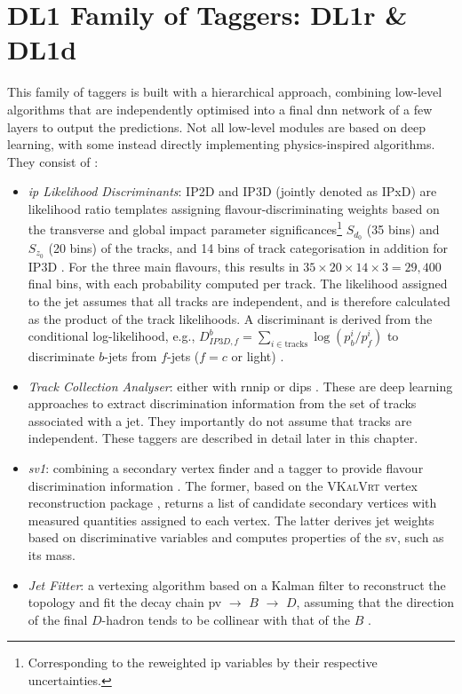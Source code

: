 \section{DL1 Family of Taggers: DL1r \& DL1d}
This family of taggers is built with a hierarchical approach, combining low-level algorithms that are independently optimised into a final \gls{dnn} network of a few layers to output the predictions. Not all low-level modules are based on deep learning, with some instead directly implementing physics-inspired algorithms. They consist of \cite{atlas:FTAGRUN2, Paganini:2289214}:
\begin{itemize}
  \item \textit{\gls{ip} Likelihood Discriminants}: IP2D and IP3D (jointly denoted as IPxD) are likelihood ratio templates assigning flavour-discriminating weights based on the transverse and global impact parameter significances\footnote{Corresponding to the reweighted \gls{ip} variables by their respective uncertainties.} $S_{d_0}$ (35 bins) and $S_{z_0}$ (20 bins) of the tracks, and 14 bins of track categorisation in addition for IP3D \cite{ATLAS:2017bcq}. For the three main flavours, this results in $35 \times 20 \times 14 \times 3 = 29,400$ final bins, with each probability computed per track. The likelihood assigned to the jet assumes that all tracks are independent, and is therefore calculated as the product of the track likelihoods. A discriminant is derived from the conditional log-likelihood, e.g., $D^b_{IP3D,f} = \sum_{i \in \textrm{tracks}} \log (p_b^i / p_f^i)$ to discriminate $b$-jets from $f$-jets ($f= c$ or light) \cite{ATL-PHYS-PUB-2015-022}.
  \item \textit{Track Collection Analyser}: either with \gls{rnnip} \cite{ATL-PHYS-PUB-2017-003} or \gls{dips} \cite{ATL-PHYS-PUB-2020-014}. These are deep learning approaches to extract discrimination information from the set of tracks associated with a jet. They importantly do not assume that tracks are independent. These taggers are described in detail later in this chapter. 
  \item \textit{\gls{sv1}}: combining a secondary vertex finder and a tagger to provide flavour discrimination information \cite{atlas:FTAGRUN2}. The former, based on the \textsc{VKalVrt} vertex reconstruction package \cite{Kostyukhin:685551}, returns a list of candidate secondary vertices with measured quantities assigned to each vertex. The latter derives jet weights based on discriminative variables and computes properties of the \gls{sv}, such as its mass. 
  \item \textit{Jet Fitter}: a vertexing algorithm based on a Kalman filter to reconstruct the topology and fit the decay chain \gls{pv} $\rightarrow$ $B$ $\rightarrow$ $D$, assuming that the direction of the final $D$-hadron tends to be collinear with that of the $B$ \cite{atlas:FTAGRUN2, ATL-PHYS-PUB-2018-025}. 
\end{itemize}

